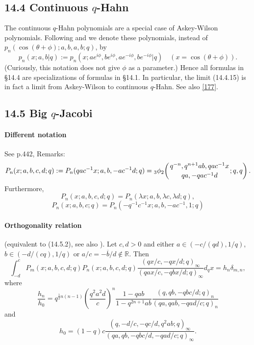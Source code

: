 \documentclass[twoside,11pt]{article}
\newcommand\RR{\mathbb{R}}
\newcommand\de\delta
\newcommand\tha\theta
\newcommand\la\lambda
\newcommand\half{\frac12}
\newcommand\iy\infty
\newcommand{\qhypK}[5]{ \mbox{}_{#1}\phi_{#2}\!\left(
  \genfrac{}{}{0pt}{}{#3}{#4};#5\right)}
\begin{document}
\subsection*{14.4 Continuous $q$-Hahn}
\label{sec14.4}
The continuous $q$-Hahn polynomials are a special case of Askey-Wilson polynomials.
Following  and 
we denote these polynomials, instead of
$p_n(\cos(\tha+\phi);a ,b,a ,b;q)$, by
\[
p_n(x;a,b |  q):=p_n(x;a e^{i\phi},b e^{i\phi},a e^{-i\phi},b e^{-i\phi} |  q)\quad
(x=\cos(\tha+\phi)).
\]
(Curiously, this notation does not give $\phi$ as a parameter.)\;
Hence all formulas in \S14.4 are specializations of formulas in \S14.1.
In particular, the limit (14.4.15) is in fact a limit from Askey-Wilson to
continuous $q$-Hahn. See also \eqref{177}.
%
\subsection*{14.5 Big $q$-Jacobi}
\label{sec14.5}
%
\paragraph{Different notation}
See p.442, Remarks:
\begin{equation}
P_n(x;a,b,c,d;q):=P_n(qac^{-1}x;a,b,-ac^{-1}d;q)
=\qhypK32{q^{-n},q^{n+1}ab,qac^{-1}x}{qa,-qac^{-1}d}{q,q}.
\label{123}
\end{equation}
Furthermore,
\begin{equation}
P_n(x;a,b,c,d;q)=P_n(\la x;a,b,\la c,\la d;q),
\label{141}
\end{equation}
\begin{equation}
P_n(x;a,b,c;q)=P_n(-q^{-1}c^{-1}x;a,b,-ac^{-1},1;q)
\label{142}
\end{equation}
%
\paragraph{Orthogonality relation}
(equivalent to (14.5.2), see also \cite[(2.42), (2.41), (2.36), (2.35)]{K17}).
Let $c,d>0$ and either $a\in (-c/(qd),1/q)$, $b\in(-d/(cq),1/q)$ or
$a/c=-\overline b/d\notin\RR$. Then
\begin{equation}
\int_{-d}^c P_m(x;a,b,c,d;q) P_n(x;a,b,c,d;q) 
\frac{(qx/c,-qx/d;q)_\iy}{(qax/c,-qbx/d;q)_\iy} d_qx=h_n \de_{m,n} ,
\label{124}
\end{equation}
where
\begin{equation}
\frac{h_n}{h_0}=q^{\half n(n-1)}\left(\frac{q^2a^2d}c\right)^n 
\frac{1-qab}{1-q^{2n+1}ab} 
\frac{(q,qb,-qbc/d;q)_n}{(qa,qab,-qad/c;q)_n}
\label{125}
\end{equation}
and
\begin{equation}
h_0=(1-q)c \frac{(q,-d/c,-qc/d,q^2ab;q)_\iy}
{(qa,qb,-qbc/d,-qad/c;q)_\iy} .
\label{126}
\end{equation}
%
\end{document}
